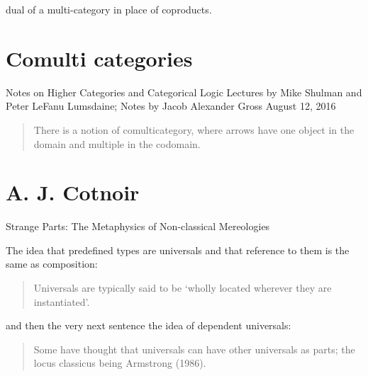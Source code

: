 \documentclass[10pt,a4paper]{scrartcl}
\begin{document}
dual of a multi-category in place of coproducts. 

\section{Comulti categories}
Notes on Higher Categories and Categorical Logic
Lectures by Mike Shulman and Peter LeFanu Lumsdaine;
Notes by Jacob Alexander Gross
August 12, 2016
\begin{quote}
There is a notion of comulticategory, where
arrows have one object in the domain and multiple in the codomain. 
\end{quote}

\section{A. J. Cotnoir}
Strange Parts: The Metaphysics of Non-classical Mereologies

The idea that predefined types are universals and that reference to them is the same as composition:
\begin{quote}
Universals are typically said to be ‘wholly located wherever they are instantiated’.
\end{quote}
and then the very next sentence the idea of dependent universals:
\begin{quote}
Some have thought that universals can have other universals as parts; the locus classicus being
Armstrong (1986).
\end{quote}
\end{document}
